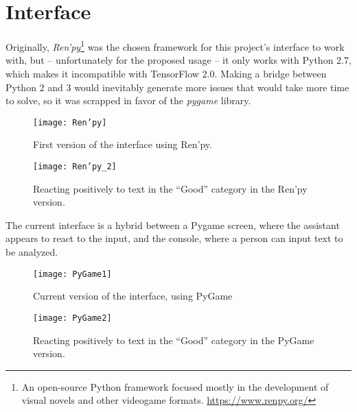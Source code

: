 \section{Interface}
Originally, \textit{Ren'py}\footnote{An open-source Python framework focused mostly in the development of visual novels and other videogame formats. \url{https://www.renpy.org/}} was the chosen framework for this project's interface to work with, but -- unfortunately for the proposed usage -- it only works with Python 2.7, which makes it incompatible with TensorFlow 2.0. Making a bridge between Python 2 and 3 would inevitably generate more issues that would take more time to solve, so it was scrapped in favor of the \textit{pygame} library.
\pagebreak

\begin{figure}[!h]
	\centering
	\texttt{[image: Ren'py]}
	\caption{First version of the interface using Ren'py.}
	\label{fig:renpy_test_1}
\end{figure}
\begin{figure}[!h]
	\centering
	\texttt{[image: Ren'py\_2]}
	\caption{Reacting positively to text in the ``Good'' category in the Ren'py version.}
	\label{fig:renpy_test_2}
\end{figure}

The current interface is a hybrid between a Pygame screen, where the assistant appears to react to the input, and the console, where a person can input text to be analyzed.

\begin{figure}[!h]
	\centering
	\texttt{[image: PyGame1]}
	\caption{Current version of the interface, using PyGame}
	\label{fig:PyGame1}
\end{figure}
\begin{figure}[!h]
	\centering
	\texttt{[image: PyGame2]}
	\caption{Reacting positively to text in the ``Good'' category in the PyGame version.}
	\label{fig:PyGame2}
\end{figure}

